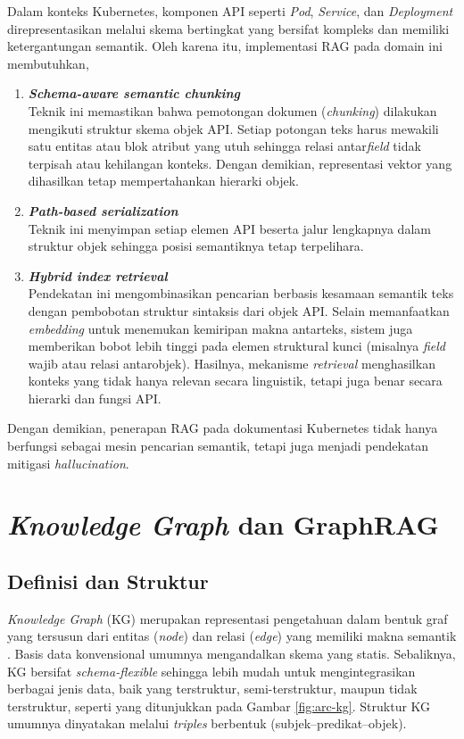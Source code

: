 Dalam konteks Kubernetes, komponen API seperti \textit{Pod}, \textit{Service}, dan \textit{Deployment} direpresentasikan melalui skema bertingkat yang bersifat kompleks dan memiliki ketergantungan semantik. Oleh karena itu, implementasi RAG pada domain ini membutuhkan,
\begin{enumerate}
    \item \textbf{\textit{Schema-aware semantic chunking}}\\
    Teknik ini memastikan bahwa pemotongan dokumen (\textit{chunking}) dilakukan mengikuti struktur skema objek API. Setiap potongan teks harus mewakili satu entitas atau blok atribut yang utuh sehingga relasi antar\textit{field} tidak terpisah atau kehilangan konteks. Dengan demikian, representasi vektor yang dihasilkan tetap mempertahankan hierarki objek.

    \item \textbf{\textit{Path-based serialization}}\\
    Teknik ini menyimpan setiap elemen API beserta jalur lengkapnya dalam struktur objek sehingga posisi semantiknya tetap terpelihara.

    \item \textbf{\textit{Hybrid index retrieval}}\\
    Pendekatan ini mengombinasikan pencarian berbasis kesamaan semantik teks dengan pembobotan struktur sintaksis dari objek API. Selain memanfaatkan \textit{embedding} untuk menemukan kemiripan makna antarteks, sistem juga memberikan bobot lebih tinggi pada elemen struktural kunci (misalnya \textit{field} wajib atau relasi antarobjek). Hasilnya, mekanisme \textit{retrieval} menghasilkan konteks yang tidak hanya relevan secara linguistik, tetapi juga benar secara hierarki dan fungsi API.
\end{enumerate}

Dengan demikian, penerapan RAG pada dokumentasi Kubernetes tidak hanya berfungsi sebagai mesin pencarian semantik, tetapi juga menjadi pendekatan mitigasi \textit{hallucination}.

\section{\textit{Knowledge Graph} dan GraphRAG}
\subsection{Definisi dan Struktur}
\textit{Knowledge Graph} (KG) merupakan representasi pengetahuan dalam bentuk graf yang tersusun dari entitas (\textit{node}) dan relasi (\textit{edge}) yang memiliki makna semantik \parencite{hofer2024construction}. Basis data konvensional umumnya mengandalkan skema yang statis. Sebaliknya, KG bersifat \textit{schema-flexible} sehingga lebih mudah untuk mengintegrasikan berbagai jenis data, baik yang terstruktur, semi-terstruktur, maupun tidak terstruktur, seperti yang ditunjukkan pada Gambar \ref{fig:arc-kg}. Struktur KG umumnya dinyatakan melalui \textit{triples} berbentuk (subjek–predikat–objek).

